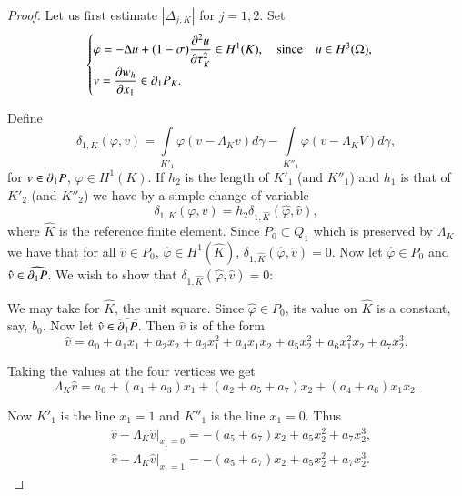 \begin{proof}
Let us first estimate $|\Delta_{j,K}|$ for $j=1,2$. Set
$$
\begin{cases}
\varphi =-\Delta u+(1-\sigma)\dfrac{\partial^{2}u}{\partial \tau^{2}_{K}}\in
H^{1}(K),\quad\text{since}\quad u\in H^{3}(\Omega),\\
v=\dfrac{\partial w_{h}}{\partial x_{1}}\in \partial_{1}P_{K}.
\end{cases}
$$

Define\pageoriginale
\begin{equation*}
\delta_{1,K}(\varphi,v)=\int\limits_{K'_{1}}\varphi(v-\Lambda_{K}v)d\gamma-\int\limits_{K''_{1}}\varphi(v-\Lambda_{K}V)d\gamma,\tag{11.24}\label{chap11-eq11.24} 
\end{equation*}
for $v\in\partial_{1}P$, $\varphi\in H^{1}(K)$. If $h_{2}$ is the length of
$K'_{1}$ (and $K''_{1}$) and $h_{1}$ is that of $K'_{2}$ (and
$K''_{2}$) we have by a simple change of variable
\begin{equation*}
\delta_{1,K}(\varphi,v)=h_{2}\delta_{1,\hat{K}}(\hat{\varphi},\hat{v}),\tag{11.25}\label{chap11-eq11.25} 
\end{equation*}
where $\hat{K}$ is the reference finite element. Since $P_{0}\subset
Q_{1}$ which is preserved by $\Lambda_{K}$ we have that for all
$\hat{v}\in P_{0}$, $\hat{\varphi}\in H^{1}(\hat{K})$,
$\delta_{1,\hat{K}}(\hat{\varphi},\hat{v})=0$. Now let
$\hat{\varphi}\in P_{0}$ and $\hat{v}\in \widehat{\partial_{1}P}$. We wish
to show that $\delta_{1,\hat{K}}(\hat{\varphi},\hat{v})=0$: 

We may take for $\hat{K}$, the unit square. Since $\hat{\varphi}\in
P_{0}$, its value on $\hat{K}$ is a constant, say, $b_{0}$. Now let
$\hat{v}\in \widehat{\partial_{1}P}$. Then $\hat{v}$ is of the form
\begin{equation*}
\hat{v}=a_{0}+a_{1}x_{1}+a_{2}x_{2}+a_{3}x^{2}_{1}+a_{4}x_{1}x_{2}+a_{5}x^{2}_{2}+a_{6}x^{2}_{1}x_{2}+a_{7}x^{3}_{2}. \tag{11.26}\label{chap11-eq11.26} 
\end{equation*}

Taking the values at the four vertices we get
\begin{equation*}
\Lambda_{K}\hat{v}=a_{0}+(a_{1}+a_{3})x_{1}+(a_{2}+a_{5}+a_{7})x_{2}+(a_{4}+a_{6})x_{1}x_{2}.\tag{11.27}\label{chap11-eq11.27}
\end{equation*}

Now $K'_{1}$ is the line $x_{1}=1$ and $K''_{1}$ is the line
$x_{1}=0$. Thus
\begin{align*}
&
  \hat{v}-\Lambda_{K}\hat{v}\Big|_{x_{1}=0}=-(a_{5}+a_{7})x_{2}+a_{5}x^{2}_{2}+a_{7}x^{3}_{2},\\
&
  \hat{v}-\Lambda_{K}\hat{v}\Big|_{x_{1}=1}=-(a_{5}+a_{7})x_{2}+a_{5}x^{2}_{2}+a_{7}x^{3}_{2}. 
\end{align*}


\end{proof}
